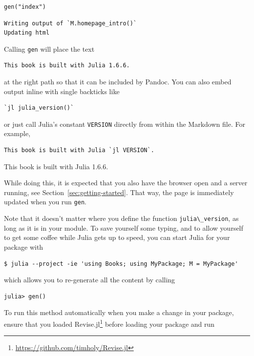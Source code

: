 \documentclass[
  notoc %
]{tufte-book}
\DeclareRobustCommand{\href}[2]{#2\footnote{\url{#1}}}
\newcommand{\passthrough}[1]{#1}
\begin{document}
\begin{lstlisting}
gen("index")
\end{lstlisting}

\begin{lstlisting}[language=Output]
Writing output of `M.homepage_intro()`
Updating html
\end{lstlisting}

Calling \passthrough{\lstinline!gen!} will place the text

\begin{lstlisting}
This book is built with Julia 1.6.6.
\end{lstlisting}

at the right path so that it can be included by Pandoc. You can also
embed output inline with single backticks like

\begin{lstlisting}
`jl julia_version()`
\end{lstlisting}

or just call Julia's constant \passthrough{\lstinline!VERSION!} directly
from within the Markdown file. For example,

\begin{lstlisting}
This book is built with Julia `jl VERSION`.
\end{lstlisting}

This book is built with Julia 1.6.6.

While doing this, it is expected that you also have the browser open and
a server running, see Section~\ref{sec:getting-started}. That way, the
page is immediately updated when you run \passthrough{\lstinline!gen!}.

Note that it doesn't matter where you define the function
\passthrough{\lstinline!julia\_version!}, as long as it is in your
module. To save yourself some typing, and to allow yourself to get some
coffee while Julia gets up to speed, you can start Julia for your
package with

\begin{lstlisting}
$ julia --project -ie 'using Books; using MyPackage; M = MyPackage'
\end{lstlisting}

which allows you to re-generate all the content by calling

\begin{lstlisting}
julia> gen()
\end{lstlisting}

To run this method automatically when you make a change in your package,
ensure that you loaded
\href{https://github.com/timholy/Revise.jl}{Revise.jl} before loading
your package and run
\end{document}

